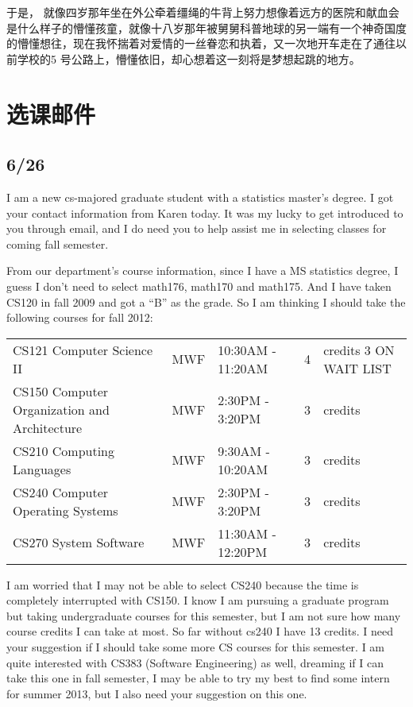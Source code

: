 \documentclass[12pt]{book}
\begin{document}
于是， 就像四岁那年坐在外公牵着缰绳的牛背上努力想像着远方的医院和献血会是什么样子的懵懂孩童，就像十八岁那年被舅舅科普地球的另一端有一个神奇国度的懵懂想往，现在我怀揣着对爱情的一丝眷恋和执着，又一次地开车走在了通往以前学校的5 号公路上，懵懂依旧，却心想着这一刻将是梦想起跳的地方。

\chapter{选课邮件}
\label{sec-2}

\section{6/26}
\label{sec-2-1}
I am a new cs-majored graduate student with a statistics master’s degree. I got your contact information from Karen today. It was my lucky to get introduced to you through email, and I do need you to help assist me in selecting classes  for coming fall semester.

From our department’s course information, since I have a MS statistics degree, I guess I don’t need to select math176, math170 and math175. And I have taken CS120 in fall 2009 and got a “B” as the grade. So I am thinking I should take the following courses for fall 2012:
\begin{center}
\begin{tabular}{lllrl}
\hline
CS121 Computer Science II & MWF & 10:30AM - 11:20AM & 4 & credits  3 ON WAIT LIST\\
CS150 Computer Organization and Architecture & MWF & 2:30PM - 3:20PM & 3 & credits\\
CS210 Computing Languages & MWF & 9:30AM - 10:20AM & 3 & credits\\
CS240 Computer Operating Systems & MWF & 2:30PM - 3:20PM & 3 & credits\\
CS270 System Software & MWF & 11:30AM - 12:20PM & 3 & credits\\
\hline
\end{tabular}
\end{center}

I am worried that I may not be able to select CS240 because the time is completely interrupted with CS150. I know I am pursuing a graduate program but taking undergraduate courses for this semester, but I am not sure how many course credits I can take at most. So far without cs240 I have 13 credits. I need your suggestion if I should take some more CS courses for this semester. I am quite interested with CS383 (Software Engineering) as well, dreaming if I can take this one in fall semester, I may be able to try my best to find some intern for summer 2013, but I also need your suggestion on this one.
\end{document}
